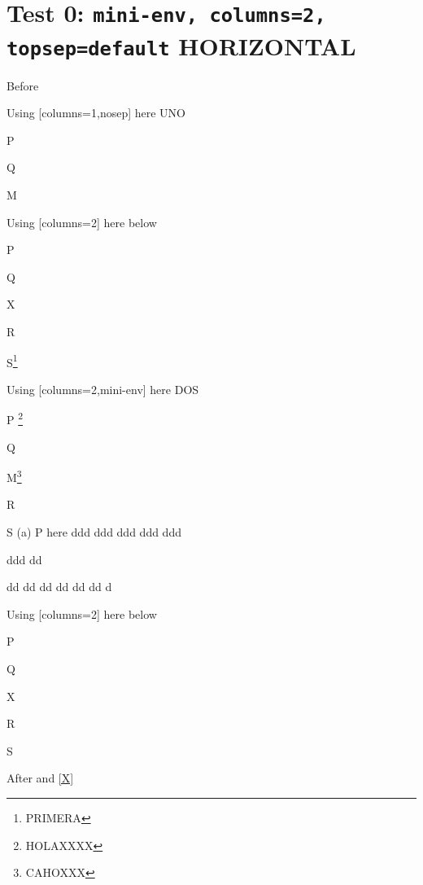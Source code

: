 \documentclass[12pt]{article}
\begin{document}
\section{Test 0: \texttt{mini-env, columns=2, topsep=default} HORIZONTAL}

Before
\begin{enumext}[columns=2,nosep]

\item Using [columns=1,nosep] here UNO
  \begin{enumext}[columns=1,topsep=3cm]%
     \item  P \item Q \item M %
  \end{enumext}

\item Using [columns=2] here below
\begin{enumext}[columns=2]%
     \item  P \item Q \item X  \item R \item S\footnote{PRIMERA}
  \end{enumext}

\columnbreak

\item Using [columns=2,mini-env] here DOS
  \begin{enumext}[topsep=3cm,columns=2,mini-env={0.4\linewidth},after={\footnotetext[7]{Some text}}]%
    \item  P \footnote{HOLAXXXX}\item Q \item M\label{X}\footnote{CAHOXXX} \item R \item S\footnotemark[7]%
    \miniright
    (a) P here
    ddd
    ddd
    ddd
    ddd
    ddd

    ddd
    dd

    dd
    dd
    dd
    dd
    dd
    dd
    d
  \end{enumext}

\item Using [columns=2] here below
\begin{enumext}[columns=2]%
     \item  P \item Q \item X  \item R \item S
  \end{enumext}

\end{enumext}
After  and \ref{X}
\end{document}
